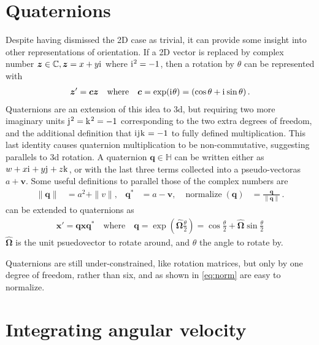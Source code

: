 \documentclass[main.tex]{subfiles}
\begin{document}
\section{Quaternions}

	\newcommand{\iu}{\mathrm{i}\mkern1mu}
	\newcommand{\ju}{\mathrm{j}\mkern1mu}
	\newcommand{\ku}{\mathrm{k}\mkern1mu}

	Despite having dismissed the 2D case as trivial, it can provide some insight into other representations of orientation.
	If a 2D vector is replaced by complex number $\bm{z} \in \mathbb{C}, \bm{z} = x+y\iu$ where $\iu^2 = -1$, then a rotation by $\theta$ can be represented with
	\begin{align}
		\bm{z}' = \bm{c}\bm{z} \quad \text{where} \quad \bm{c} = \exp(\iu\theta) = (\cos \theta + \iu \sin \theta)\,.
		\label{eq:rot:complex}
	\end{align}
	Quaternions are an extension of this idea to 3d, but requiring two more imaginary units $\ju^2 = \ku^2 = -1$ corresponding to the two extra degrees of freedom, and the additional definition that $\iu\ju\ku = -1$ to fully defined multiplication.
	This last identity causes quaternion multiplication to be non-commutative, suggesting parallels to 3d rotation.
	A quaternion $\bm{q} \in \mathbb{H}$ can be written either as $w + x\iu + y\ju + z\ku$, or with the last three terms collected into a pseudo-vector\footnotemark as $a + \bm{v}$. Some useful definitions to parallel those of the complex numbers are
	\begin{align}
		\|\bm{q}\| &= a^2 + \|v\|, &
		\bm{q}^* &= a - \bm{v}, &
		\operatorname{normalize}(\bm{q}) &= \frac{\bm{q}}{\|\bm{q}\|}\,.
		\label{eq:norm}
	\end{align}
	 can be extended to quaternions as
	\begin{align}
		\bm{x}' = \bm{q} \bm{x} \bm{q}^* \quad \text{where} \quad
		\bm{q} = \exp\left(\hat{\bm{\Omega}}\tfrac{\theta}{2}\right) = \cos \tfrac{\theta}{2} + \hat{\bm{\Omega}} \sin \tfrac{\theta}{2}
		\label{eq:quat:exp}
	\end{align}
	$\hat{\bm{\Omega}}$ is the unit psuedovector to rotate around, and $\theta$ the angle to rotate by.

	Quaternions are still under-constrained, like rotation matrices, but only by one degree of freedom, rather than six, and as shown in \cref{eq:norm} are easy to normalize.

\section{Integrating angular velocity}
\end{document}
